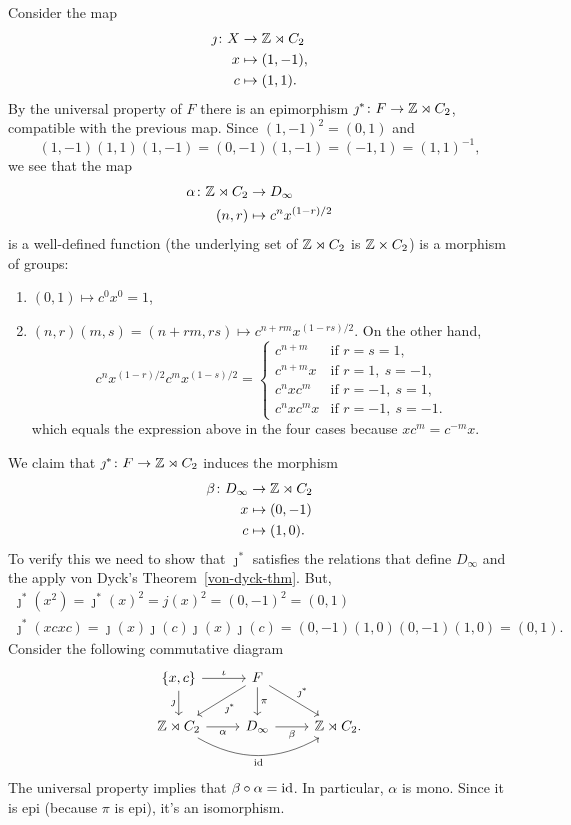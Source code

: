 Consider the map
\begin{align*}
    \jmath\colon X&\to\mathbb{Z}\rtimes C_2\\
    x&\mapsto (1,-1),\\
    c&\mapsto (1,1).
\end{align*}
By the universal property of $F$ there is an epimorphism $\jmath^*\colon F\to\mathbb{Z}\rtimes C_2$, compatible with the previous map. Since $(1,-1)^2=(0,1)$ and
$$
    (1,-1)(1,1)(1,-1)=(0,-1)(1,-1)=(-1,1)=(1,1)^{-1},
$$
we see that the map
\begin{align*}
    \alpha\colon\mathbb{Z}\rtimes C_2&\to D_\infty\\
    (n,r)&\mapsto c^nx^{(1-r)/2}
\end{align*}
is a well-defined function (the underlying set of $\mathbb{Z}\rtimes C_2$ is $\mathbb{Z}\times C_2$) is a morphism of groups:
\begin{enumerate}[\rm-]
    \item $(0,1)\mapsto c^0x^0=1$,
    \item $(n,r)(m,s)=(n+rm,rs)\mapsto c^{n+rm}x^{(1-rs)/2}$. On the other hand,
    $$
        c^nx^{(1-r)/2}c^mx^{(1-s)/2}
            = \begin{cases}
                c^{n+m}     &\text{if }r=s=1,\\
                c^{n+m}x  &\text{if }r=1,\ s=-1,\\
                c^nxc^m     &\text{if }r=-1,\ s=1,\\
                c^nxc^mx    &\text{if }r=-1,\ s=-1.
            \end{cases}
    $$
    which equals the expression above in the four cases because $xc^m=c^{-m}x$.
\end{enumerate}
We claim that $\jmath^*\colon F\to\mathbb{Z}\rtimes C_2$ induces the morphism
\begin{align*}
    \beta\colon D_\infty&\to\mathbb{Z}\rtimes C_2\\
    x&\mapsto(0,-1)\\
    c&\mapsto(1,0).
\end{align*}
To verify this we need to show that $\jmath^*$ satisfies the relations that define $D_\infty$ and the apply von Dyck's Theorem~\ref{von-dyck-thm}. But,
\begin{gather*}
    \jmath^*(x^2) = \jmath^*(x)^2=j(x)^2=(0,-1)^2=(0,1)\\
    \jmath^*(xcxc) = \jmath(x)\jmath(c)\jmath(x)\jmath(c)
        =(0,-1)(1,0)(0,-1)(1,0)=(0,1).
\end{gather*}
Consider the following commutative diagram
$$
\begin{tikzcd}
    {\set{x,c}}
            \arrow[r,"\iota"]
            \arrow[d,"\jmath"']
        &F
            \arrow[d,"\pi"]
            \arrow[ld,"\jmath^*"]
            \arrow[rd,"\jmath^*"]\\
    \Z\rtimes C_2
            \arrow[r,"\alpha"']
            \arrow[rr,"\id"',bend right]
        &D_\infty
            \arrow[r,"\beta"']
        &\Z\rtimes C_2.
\end{tikzcd}
$$
The universal property implies that $\beta\circ\alpha=\operatorname{id}$. In particular, $\alpha$ is mono. Since it is epi (because $\pi$ is epi), it's an isomorphism.


